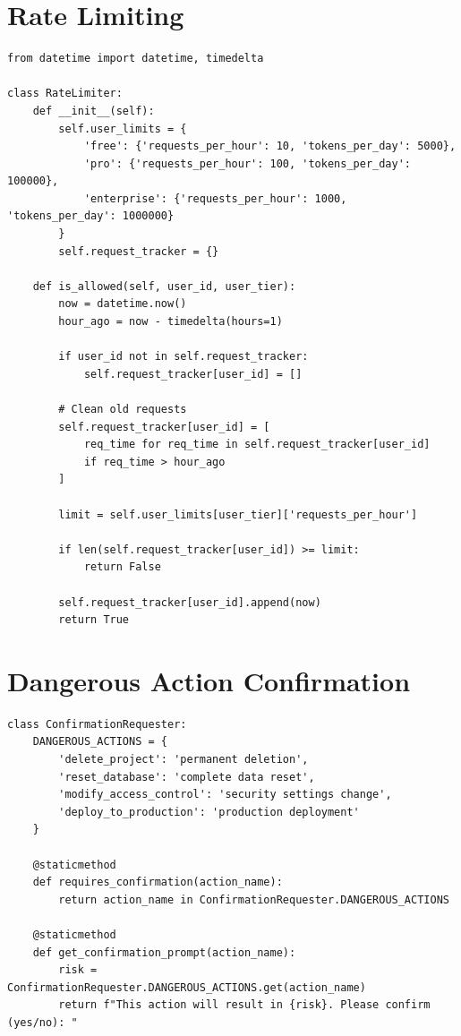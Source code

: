 \documentclass{report}
\begin{document}
\section{Rate Limiting}

\begin{lstlisting}
from datetime import datetime, timedelta

class RateLimiter:
    def __init__(self):
        self.user_limits = {
            'free': {'requests_per_hour': 10, 'tokens_per_day': 5000},
            'pro': {'requests_per_hour': 100, 'tokens_per_day': 100000},
            'enterprise': {'requests_per_hour': 1000, 'tokens_per_day': 1000000}
        }
        self.request_tracker = {}
    
    def is_allowed(self, user_id, user_tier):
        now = datetime.now()
        hour_ago = now - timedelta(hours=1)
        
        if user_id not in self.request_tracker:
            self.request_tracker[user_id] = []
        
        # Clean old requests
        self.request_tracker[user_id] = [
            req_time for req_time in self.request_tracker[user_id]
            if req_time > hour_ago
        ]
        
        limit = self.user_limits[user_tier]['requests_per_hour']
        
        if len(self.request_tracker[user_id]) >= limit:
            return False
        
        self.request_tracker[user_id].append(now)
        return True
\end{lstlisting}

\section{Dangerous Action Confirmation}

\begin{lstlisting}
class ConfirmationRequester:
    DANGEROUS_ACTIONS = {
        'delete_project': 'permanent deletion',
        'reset_database': 'complete data reset',
        'modify_access_control': 'security settings change',
        'deploy_to_production': 'production deployment'
    }
    
    @staticmethod
    def requires_confirmation(action_name):
        return action_name in ConfirmationRequester.DANGEROUS_ACTIONS
    
    @staticmethod
    def get_confirmation_prompt(action_name):
        risk = ConfirmationRequester.DANGEROUS_ACTIONS.get(action_name)
        return f"This action will result in {risk}. Please confirm (yes/no): "
\end{lstlisting}
\end{document}
